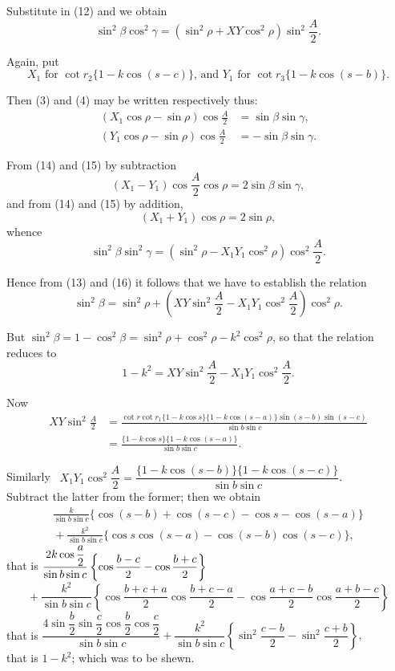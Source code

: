 \documentclass{book}[2004/02/16]
\begin{document}
\begin{mainmatter}
\begin{spacing}{1.3}
Substitute in (12) and we obtain
\[
\sin^2\beta\cos^2\gamma=(\sin^2\rho+XY\cos^2\rho)\sin^2\frac A2.\tag{13}
\]

Again, put
\[
\text{$X_1$ for $\cot r_2\{1-k\cos(s-c)\}$, and $Y_1$ for $\cot r_3\{1-k\cos(s-b)\}$.}
\]

Then (3) and (4) may be written respectively thus:
\begin{align*}
(X_1\cos\rho-\sin\rho)\cos\frac A2 &= \sin\beta\sin\gamma,\tag{14}\\
(Y_1\cos\rho-\sin\rho)\cos\frac A2 &= -\sin\beta\sin\gamma.\tag{15}
\end{align*}

From (14) and (15) by subtraction
\[
(X_1-Y_1)\cos\frac A2\cos\rho = 2\sin\beta\sin\gamma,
\]
and from (14) and (15) by addition,
\[
  (X_1+Y_1)\cos\rho = 2\sin\rho,
\]
whence
\[
  \sin^2 \beta \sin^2 \gamma = (\sin^2 \rho - X_1 Y_1 \cos^2\rho) \cos^2 \frac{A}{2}. \tag{16}
\]

Hence from (13) and (16) it follows that we have to establish
the relation
\[
  \sin^2 \beta = \sin^2\rho + \left( XY\sin^2\frac{A}{2} - X_1 Y_1 \cos^2 \frac{A}{2} \right) \cos^2\rho.
\]

But $\sin^2\beta = 1-\cos^2\beta = \sin^2\rho + \cos^2 \rho - k^2\cos^2\rho$,
so that the relation
reduces to
\[
  1-k^2 = XY\sin^2\frac{A}{2} - X_1 Y_1 \cos^2 \frac{A}{2}.
\]

Now
\begin{align*}
XY\sin^2\frac{A}{2}
&= \frac{\cot r \cot r_1 \{1-k\cos s\} \{1-k\cos(s-a)\} \sin(s-b)\sin(s-c)}{\sin b \sin c} \\[1.5ex]
&= \frac{\{1-k\cos s\} \{1-k\cos(s-a) \} }{\sin b \sin c }.
\end{align*}

Similarly \ $
X_1 Y_1 \cos^2 \dfrac{A}{2} = \dfrac{\{1-k\cos(s-b) \} \{1-k\cos(s-c) \} }{\sin b \sin c}$.\\[2ex]

Subtract the latter from the former; then we obtain
\begin{gather*}
\frac{k}{\sin b \sin c} \{\cos(s-b) + \cos(s-c) -\cos s -\cos(s-a) \} \\[1.5ex]
{}+ \frac{k^2}{\sin b \sin c} \{\cos s \cos(s-a) - \cos(s-b)\cos(s-c) \},
\end{gather*}
that is $\hfill
  \dfrac{2k\cos\dfrac{a}{2} }{\sin b\sin c}
  \left\{\cos\dfrac{b-c}{2} -\cos\dfrac{b+c}{2} \right\}
\hfill\phantom{that is}$\\[1ex]
\[
{}+\frac{k^2}{\sin b \sin c}
   \left\{\cos\frac{b+c+a}{2} \cos\frac{b+c-a}{2}
         - \cos\frac{a+c-b}{2} \cos\frac{a+b-c}{2} \right\}
\]
that is\hfill
$\displaystyle \dfrac{4\sin\dfrac{b}{2} \sin\dfrac{c}{2}
          \cos\dfrac{b}{2} \cos\dfrac{c}{2} }
       {\sin b \sin c}
+ \dfrac{k^2}{\sin b\sin c}
  \left\{\sin^2\dfrac{c-b}{2}
        - \sin^2\dfrac{c+b}{2} \right\},$\hfill{}\\[1ex]
that is $1-k^2$; which was to be shewn.


\end{spacing}
\end{mainmatter}
\end{document}
